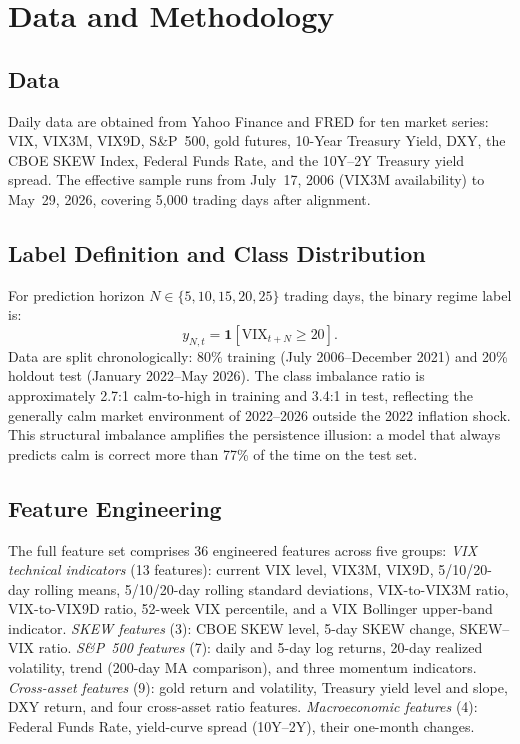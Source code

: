 \documentclass[runningheads]{llncs}
\begin{document}
\section{Data and Methodology}

\subsection{Data}
Daily data are obtained from Yahoo Finance and FRED for ten market series:
VIX, VIX3M, VIX9D, S\&P~500, gold futures, 10-Year Treasury Yield, DXY,
the CBOE SKEW Index, Federal Funds Rate, and the 10Y--2Y Treasury yield spread.
The effective sample runs from July~17, 2006 (VIX3M availability) to
May~29, 2026, covering 5{,}000 trading days after alignment.

\subsection{Label Definition and Class Distribution}

For prediction horizon $N \in \{5, 10, 15, 20, 25\}$ trading days, the binary
regime label is:
\begin{equation}
y_{N,t} = \mathbf{1}[\text{VIX}_{t+N} \geq 20].
\end{equation}
Data are split chronologically: 80\% training (July 2006--December 2021) and
20\% holdout test (January 2022--May 2026). The class imbalance ratio is
approximately 2.7:1 calm-to-high in training and 3.4:1 in test, reflecting
the generally calm market environment of 2022--2026 outside the 2022
inflation shock. This structural imbalance amplifies the persistence illusion:
a model that always predicts calm is correct more than 77\% of the time on
the test set.

\subsection{Feature Engineering}

The full feature set comprises 36 engineered features across five groups:
\textit{VIX technical indicators} (13 features): current VIX level, VIX3M,
VIX9D, 5/10/20-day rolling means, 5/10/20-day rolling standard deviations,
VIX-to-VIX3M ratio, VIX-to-VIX9D ratio, 52-week VIX percentile, and a
VIX Bollinger upper-band indicator.
\textit{SKEW features} (3): CBOE SKEW level, 5-day SKEW change, SKEW--VIX ratio.
\textit{S\&P~500 features} (7): daily and 5-day log returns, 20-day realized
volatility, trend (200-day MA comparison), and three momentum indicators.
\textit{Cross-asset features} (9): gold return and volatility, Treasury yield
level and slope, DXY return, and four cross-asset ratio features.
\textit{Macroeconomic features} (4): Federal Funds Rate, yield-curve spread
(10Y--2Y), their one-month changes.
\end{document}
